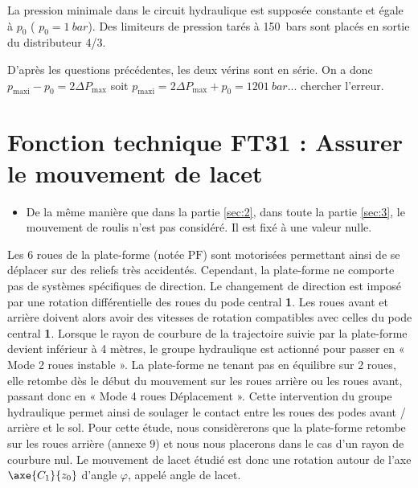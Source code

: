\else
\fi



La pression minimale dans le circuit hydraulique est supposée constante et égale à $p_0$ ( $p_0 = \SI{1}{bar}$). Des limiteurs de pression tarés à \SI{150}{bars} sont placés en sortie du distributeur 4/3.

\ifprof
\begin{corrige}
D'après les questions précédentes, les deux vérins sont en série. On a donc $p_{\text{maxi}} - p_0 = 2 \Delta P_{\text{max}}$ soit 
$p_{\text{maxi}} = 2 \Delta P_{\text{max}} + p_0 = \SI{1201}{bar}$... chercher l'erreur.
\end{corrige}
\else
\fi


\section{\label{sec:3}Fonction technique FT31 : Assurer le mouvement de lacet}

\begin{hypo}%

\begin{itemize}
\item De la même manière que dans la partie \ref{sec:2}, dans toute la partie \ref{sec:3}, le mouvement de roulis n’est pas considéré. Il est fixé à une valeur nulle.
\end{itemize}
\end{hypo}

Les 6 roues de la plate-forme (notée $\text{PF}$) sont motorisées permettant ainsi de se déplacer sur des reliefs très
accidentés. Cependant, la plate-forme ne comporte pas de systèmes spécifiques de direction. Le changement de
direction est imposé par une rotation différentielle des roues du pode central \textbf{1}. Les roues avant et arrière doivent alors avoir des vitesses de rotation compatibles avec celles du pode central \textbf{1}. Lorsque le rayon de courbure de la trajectoire suivie par la plate-forme devient inférieur à 4 mètres, le groupe hydraulique est actionné pour passer en « Mode 2 roues instable ». La plate-forme ne tenant pas en équilibre sur 2 roues, elle retombe dès le début du mouvement sur les roues arrière ou les roues avant, passant donc en « Mode 4 roues Déplacement ». Cette intervention du groupe hydraulique permet ainsi de soulager le contact entre les roues des podes avant / arrière et le sol. Pour cette étude, nous considèrerons que la plate-forme retombe sur les roues arrière (annexe 9) et nous nous placerons dans le cas d’un rayon de courbure nul. Le mouvement de lacet étudié est donc une rotation autour de l’axe $\axe{C_1}{z_0}$ d’angle $\varphi$, appelé angle de lacet.


